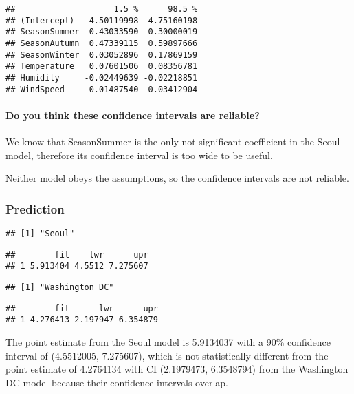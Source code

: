 \documentclass[]{article}
\let\oldparagraph\paragraph
\renewcommand{\paragraph}[1]{\oldparagraph{#1}\mbox{}}
\begin{document}
\begin{verbatim}
##                    1.5 %      98.5 %
## (Intercept)   4.50119998  4.75160198
## SeasonSummer -0.43033590 -0.30000019
## SeasonAutumn  0.47339115  0.59897666
## SeasonWinter  0.03052896  0.17869159
## Temperature   0.07601506  0.08356781
## Humidity     -0.02449639 -0.02218851
## WindSpeed     0.01487540  0.03412904
\end{verbatim}

\hypertarget{do-you-think-these-confidence-intervals-are-reliable}{%
\paragraph{Do you think these confidence intervals are
reliable?}\label{do-you-think-these-confidence-intervals-are-reliable}}

We know that SeasonSummer is the only not significant coefficient in the
Seoul model, therefore its confidence interval is too wide to be useful.

Neither model obeys the assumptions, so the confidence intervals are not
reliable.

\hypertarget{prediction}{%
\subsubsection{Prediction}\label{prediction}}

\begin{verbatim}
## [1] "Seoul"
\end{verbatim}

\begin{verbatim}
##        fit    lwr      upr
## 1 5.913404 4.5512 7.275607
\end{verbatim}

\begin{verbatim}
## [1] "Washington DC"
\end{verbatim}

\begin{verbatim}
##        fit      lwr      upr
## 1 4.276413 2.197947 6.354879
\end{verbatim}

The point estimate from the Seoul model is 5.9134037 with a 90\%
confidence interval of (4.5512005, 7.275607), which is not statistically
different from the point estimate of 4.2764134 with CI (2.1979473,
6.3548794) from the Washington DC model because their confidence
intervals overlap.
\end{document}
